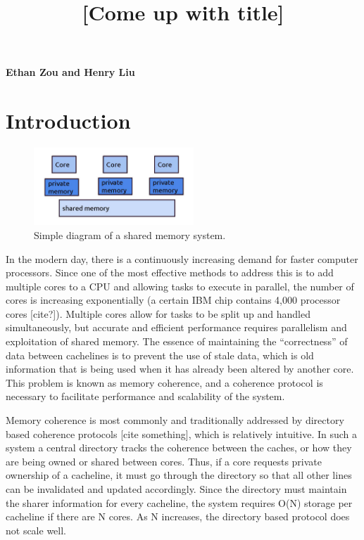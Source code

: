 \documentclass[12pt]{article}
\title{[Come up with title]}
\date{}
\begin{document}
	\maketitle
\begin{center}
	\textbf{\large{Ethan Zou and Henry Liu}}
\end{center}

\section{Introduction}

\begin{figure}
\begin{center}
  \includegraphics[width=6cm]{multicores.jpg}
  \caption{Simple diagram of a shared memory system.}
  \label{fig:multicore}
\end{center}
\end{figure}

In the modern day, there is a continuously increasing demand for faster computer processors. Since one of the most effective methods to address this is to add multiple cores to a CPU and allowing tasks to execute in parallel, the number of cores is increasing exponentially (a certain IBM chip contains 4,000 processor cores [cite?]). Multiple cores allow for tasks to be split up and handled simultaneously, but accurate and efficient performance requires parallelism and exploitation of shared memory. The essence of maintaining the “correctness” of data between cachelines is to prevent the use of stale data, which is old information that is being used when it has already been altered by another core. This problem is known as memory coherence, and a coherence protocol is necessary to facilitate performance and scalability of the system.

Memory coherence is most commonly and traditionally addressed by directory based coherence protocols [cite something], which is relatively intuitive. In such a system a central directory tracks the coherence between the caches, or how they are being owned or shared between cores. Thus, if a core requests private ownership of a cacheline, it must go through the directory so that all other lines can be invalidated and updated accordingly. Since the directory must maintain the sharer information for every cacheline, the system requires O(N) storage per cacheline if there are N cores. As N increases, the directory based protocol does not scale well.
\end{document}
